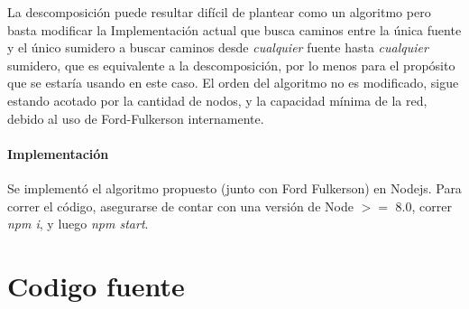 \documentclass{article}
\begin{document}
La descomposición puede resultar difícil de plantear como un algoritmo pero basta modificar la Implementación actual que busca caminos entre la única fuente y el único sumidero a buscar caminos desde \textit{cualquier} fuente hasta \textit{cualquier} sumidero, que es equivalente a la descomposición, por lo menos para el propósito que se estaría usando en este caso. El orden del algoritmo no es modificado, sigue estando acotado por la cantidad de nodos, y la capacidad mínima de la red, debido al uso de Ford-Fulkerson internamente.

\subsection{Implementación}

Se implementó el algoritmo propuesto (junto con Ford Fulkerson) en Nodejs. Para correr el código, asegurarse de contar con una versión de Node $>=$ 8.0, correr \textit{npm i}, y luego \textit{npm start}.

\newpage

\part{Codigo fuente}











\end{document}
